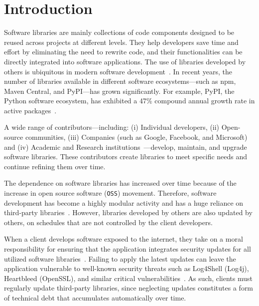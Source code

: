 \chapter{Introduction}\label{intro}
Software libraries are mainly collections of code components designed to be reused
across projects at different levels. They help developers save time and effort by
eliminating the need to rewrite code, and their functionalities can be directly integrated
into software applications.
The use of libraries developed by others is ubiquitous in modern
software development~\cite{huang22:_charac_java,wang20:_java}.
In recent years, the number of libraries available in different software ecosystems—such
as npm, Maven Central, and PyPI—has grown significantly. For example, PyPI, the Python
software ecosystem, has exhibited a 47\% compound annual growth rate in active packages~\cite{Bommarito2019}.

A wide range of contributors—including: (i) Individual developers, (ii) Open-source communities, (iii) Companies
(such as Google, Facebook, and Microsoft) and (iv) Academic and Research
institutions~\cite{Lakhani2000OSS}—develop, maintain, and upgrade software libraries.
These contributors create libraries to meet specific needs and continue refining them over time.

The dependence on software libraries has increased over time because of the increase in open source software
(\texttt{OSS}) movement. Therefore, software development has become a
highly modular activity and has a huge reliance on third-party libraries~\cite{decan2019empirical, zerouali2019formal, cox2019surviving}.
However, libraries developed by others are also updated by others, on schedules that are not controlled by
the client developers.


When a client develops software exposed to the internet, they take on a moral responsibility for ensuring that the
application integrates security updates for all utilized software libraries~\cite{wu23:_under_threat_upstr_vulner_downs}.
Failing to apply the latest updates can leave the application vulnerable to well-known security threats
such as Log4Shell (Log4j), Heartbleed (OpenSSL), and similar critical vulnerabilities~\cite{haryono22:_autom_ident_librar_vulner_data,zhan21:_atvhun,alfadel23:_empir_python}.
As such, clients must regularly update third-party libraries, since neglecting updates constitutes a
form of technical debt that accumulates automatically over time.



